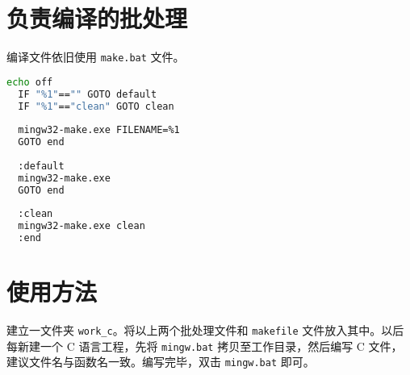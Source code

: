 \documentclass{ctexart}
\begin{document}
\section{负责编译的批处理}

编译文件依旧使用 \texttt{make.bat} 文件。

\begin{lstlisting}[language = bash]
  echo off
  IF "%1"=="" GOTO default
  IF "%1"=="clean" GOTO clean
  
  mingw32-make.exe FILENAME=%1
  GOTO end
  
  :default
  mingw32-make.exe
  GOTO end
  
  :clean
  mingw32-make.exe clean
  :end
\end{lstlisting}

\section{使用方法}

建立一文件夹 \texttt{work\_c}。将以上两个批处理文件和 \texttt{makefile} 文件放入其中。以后每新建一个 C 语言工程，先将 \texttt{mingw.bat} 拷贝至工作目录，然后编写 C 文件，建议文件名与函数名一致。编写完毕，双击 \texttt{mingw.bat} 即可。
\end{document}
